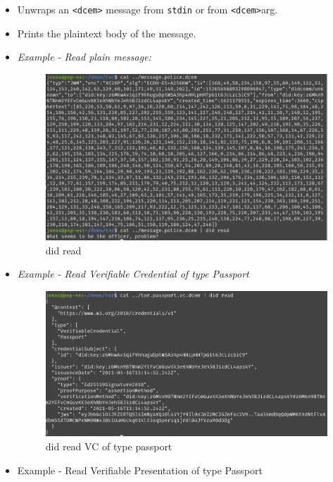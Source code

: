 \begin{itemize}
\item
  Unwraps an \lstinline!<dcem>! message from
  \lstinline!stdin! or from
  \lstinline!<dcem>!arg.
\item
  Prints the plaintext body of the message.
\item
  \emph{Example - Read plain message:}

  \begin{figure}
  \centering
  \includegraphics[width=\textwidth]{User Interface f8759a9462b24d5f95cf6123d68b89ea/Untitled 7.png}
  \caption{did read}
  \end{figure}
\item
  \emph{Example - Read Verifiable Credential of type Passport}

  \begin{figure}
  \centering
  \includegraphics[width=\textwidth]{User Interface f8759a9462b24d5f95cf6123d68b89ea/Untitled 8.png}
  \caption{did read VC of type passport}
  \end{figure}
\item
  Example - Read Verifiable Presentation of type Passport


\end{itemize}
